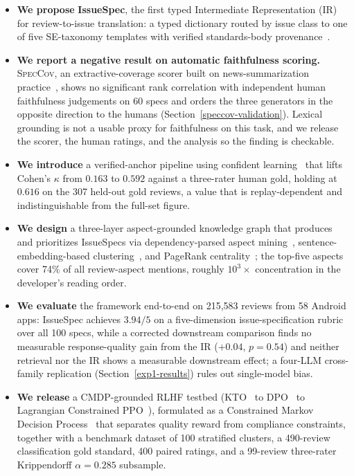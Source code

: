 \documentclass[sigconf, anonymous]{acmart}
\begin{document}
\begin{itemize}\setlength{\itemsep}{2pt}
  \item \textbf{We propose} \textbf{IssueSpec}, the first typed Intermediate Representation (IR) for review-to-issue translation: a typed dictionary routed by issue class to one of five SE-taxonomy templates with verified standards-body provenance~\cite{zimmermann2010makes, cohn2004user, international2011systems, nielsen1994usability, joorabchi2013real}.

  \item \textbf{We report a negative result on automatic faithfulness scoring.} \textsc{SpecCov}, an extractive-coverage scorer built on news-summarization practice~\cite{grusky2018newsroom, maynez2020faithfulness, kryscinski2020evaluating}, shows no significant rank correlation with independent human faithfulness judgements on 60 specs and orders the three generators in the opposite direction to the humans (Section~\ref{speccov-validation}). Lexical grounding is not a usable proxy for faithfulness on this task, and we release the scorer, the human ratings, and the analysis so the finding is checkable.

  \item \textbf{We introduce} a verified-anchor pipeline using confident learning~\cite{northcutt2021confident} that lifts Cohen's $\kappa$ from $0.163$ to $0.592$ against a three-rater human gold, holding at $0.616$ on the 307 held-out gold reviews, a value that is replay-dependent and indistinguishable from the full-set figure.
  
  \item \textbf{We design} a three-layer aspect-grounded knowledge graph that produces and prioritizes IssueSpecs via dependency-parsed aspect mining~\cite{hu2004mining},
  sentence-embedding-based clustering~\cite{reimers2019sentence, mcinnes2018umap,
  mcinnes2017hdbscan}, and PageRank centrality~\cite{page1999pagerank, brin1998anatomy}; the top-five aspects cover 74\% of all review-aspect mentions, roughly $10^3\times$ concentration in the developer's reading order.

  \item \textbf{We evaluate} the framework end-to-end on 215{,}583 reviews from 58 Android apps: IssueSpec achieves $3.94/5$ on a five-dimension issue-specification rubric over all 100 specs, while a corrected downstream comparison finds no measurable response-quality gain from the IR ($+0.04$, $p = 0.54$) and neither retrieval nor the IR shows a measurable downstream effect; a four-LLM cross-family replication (Section~\ref{exp1-results}) rules out single-model bias.  

  \item \textbf{We release} a CMDP-grounded RLHF testbed (KTO~\cite{ethayarajh2024kto} to
  DPO~\cite{rafailov2023direct} to Lagrangian Constrained PPO~\cite{schulman2017proximal, dai2024safe}), formulated as a Constrained Markov Decision Process~\cite{altman2021constrained, dai2024safe} that separates quality reward from compliance constraints, together with a benchmark dataset of 100 stratified clusters, a 490-review classification gold standard, 400 paired ratings, and a 99-review three-rater Krippendorff $\alpha = 0.285$ subsample.
  \end{itemize}
\end{document}
